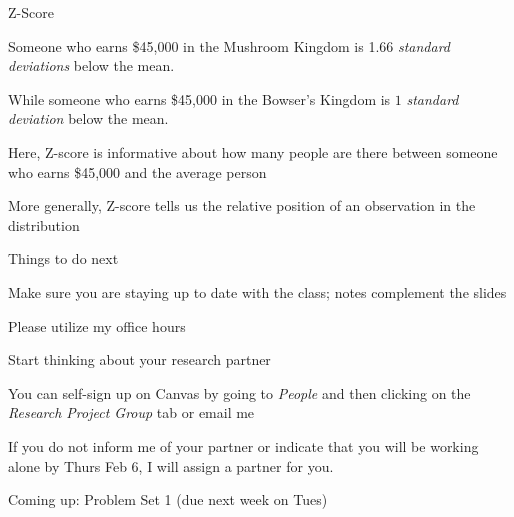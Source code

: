 \documentclass{./../div_teaching_slides}
\begin{document}
\begin{frame}{Z-Score}
\begin{witemize}
\item Someone who earns \$45,000 in the Mushroom Kingdom is 1.66 \textit{standard deviations} below the mean.
\item While someone who earns \$45,000 in the  Bowser's Kingdom is $1$ \textit{standard deviation} below the mean.
  \item Here, Z-score is informative about how many people are there between someone who earns \$45,000 and the average person 
  \item More generally, Z-score tells us the relative position of an observation in the distribution
\end{witemize}
\end{frame}

\begin{frame}{Things to do next}
\begin{witemize}
\item Make sure you are staying up to date with the class; notes complement the slides
\item Please utilize my office hours
\item Start thinking about your research partner \vspace{0.5em}
\begin{mitemize}
  \item You can self-sign up on Canvas by going to \textit{People} and then clicking on the \textit{Research Project Group} tab or email me
\item If you do not inform me of your partner or indicate that you will be working alone by Thurs Feb 6, I will assign a partner for you.
\end{mitemize}
\item Coming up: Problem Set 1 (due next week on Tues)
\end{witemize}
\end{frame}
\end{document}
